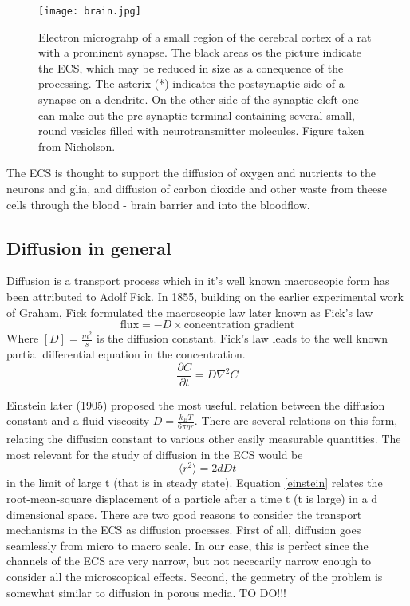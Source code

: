 \documentclass[a4paper,english, 10pt, twoside]{article}
\renewcommand{\d}{\partial}
\begin{document}
\begin{figure}[H]
 \centering
 \texttt{[image: brain.jpg]}
 \caption{Electron micrograhp of a small region of the cerebral cortex of a rat with a prominent synapse. 
 The black areas os the picture indicate the ECS, which may be reduced in size as a conequence of the processing. 
 The asterix (*) indicates the postsynaptic side of a synapse on a dendrite. 
 On the other side of the synaptic cleft one can make out the pre-synaptic terminal containing several small, round vesicles filled with neurotransmitter molecules. 
 Figure taken from Nicholson.}
 \label{ECS}
\end{figure}

The ECS is thought to support the diffusion of oxygen and nutrients to the neurons and glia, and diffusion of carbon dioxide and other waste from theese cells through the blood - brain barrier and into the bloodflow. 

\subsection{Diffusion in general}
Diffusion is a transport process which in it's well known macroscopic form has been attributed to Adolf Fick. 
In 1855, building on the earlier experimental work of Graham, Fick formulated the macroscopic law later known as Fick's law
\begin{equation}
 \text{flux} = -D\times\text{concentration gradient}
\end{equation}
Where $[D] = \frac{m^2}{s}$ is the diffusion constant. Fick's law leads to the well known partial differential equation in the concentration.
\begin{equation}
 \frac{\d C}{\d t} = D\nabla^2C
\end{equation}

Einstein later (1905) proposed the most usefull relation between the diffusion constant and a fluid viscosity $D = \frac{k_B T}{6\pi \eta r}$. 
There are several relations on this form, relating the diffusion constant to various other easily measurable quantities. 
The most relevant for the study of diffusion in the ECS would be
\begin{equation}\label{einstein}
 \langle r^2\rangle = 2dDt
\end{equation}
in the limit of large t (that is in steady state). Equation \ref{einstein} relates the root-mean-square displacement of a particle after a time t (t is large) in a d dimensional space. 
There are two good reasons to consider the transport mechanisms in the ECS as diffusion processes. 
First of all, diffusion goes seamlessly from micro to macro scale. In our case, this is perfect since the channels of the ECS are very narrow, but not nececarily narrow enough to consider all the microscopical effects. Second, the geometry of the problem is somewhat similar to diffusion in porous media. TO DO!!!
\end{document}
